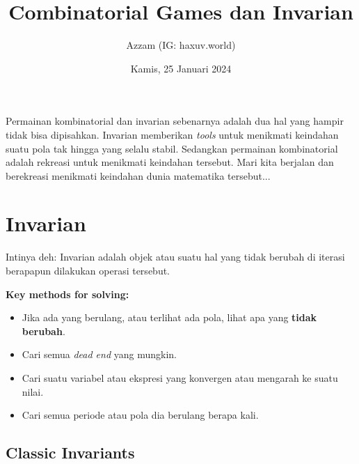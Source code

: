 \documentclass[11pt]{scrartcl}
\title{Combinatorial Games dan Invarian}
\author{Azzam (IG: haxuv.world)}
\date{Kamis, 25 Januari 2024}
\begin{document}
\maketitle
Permainan kombinatorial dan invarian sebenarnya adalah dua hal yang hampir tidak bisa dipisahkan. Invarian memberikan \textit{tools} untuk menikmati keindahan suatu pola tak hingga yang selalu stabil. Sedangkan permainan kombinatorial adalah rekreasi untuk menikmati keindahan tersebut. Mari kita berjalan dan berekreasi menikmati keindahan dunia matematika tersebut...

\section{Invarian}
\begin{definition}
    Intinya deh: Invarian adalah objek atau suatu hal yang tidak berubah di iterasi berapapun dilakukan operasi tersebut.
\end{definition}
\textbf{Key methods for solving:}
\begin{itemize}
    \item Jika ada yang berulang, atau terlihat ada pola, lihat apa yang \textbf{tidak berubah}.
    \item Cari semua \textit{dead end} yang mungkin.
    \item Cari suatu variabel atau ekspresi yang konvergen atau mengarah ke suatu nilai.
    \item Cari semua periode atau pola dia berulang berapa kali.
\end{itemize}
\subsection{Classic Invariants}
\end{document}
